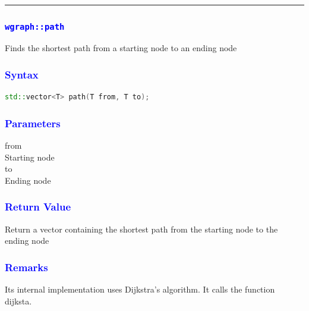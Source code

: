 \documentclass[11pt,a4paper]{article}
\begin{document}
\\
\rule{17cm}{0.1mm}


\subsubsection*{\textcolor{blue}{\Large\texttt{wgraph::path}}}
Finds the shortest path from a starting node to an ending node



\subsubsection*{\textcolor{blue}{ \large {Syntax}}}
\begin{lstlisting}[language=C++]
std::vector<T> path(T from, T to);

\end{lstlisting}

\subsubsection*{\textcolor{blue}{ \large {Parameters}}}
from\\
Starting node\\
to\\
Ending node\\



\subsubsection*{\textcolor{blue}{ \large {Return Value}}}
Return a vector containing the shortest path from the starting node to the ending node

\subsubsection*{\textcolor{blue}{ \large {Remarks}}}
Its internal implementation uses Dijkstra's algorithm. It calls the function dijksta.
\end{document}

